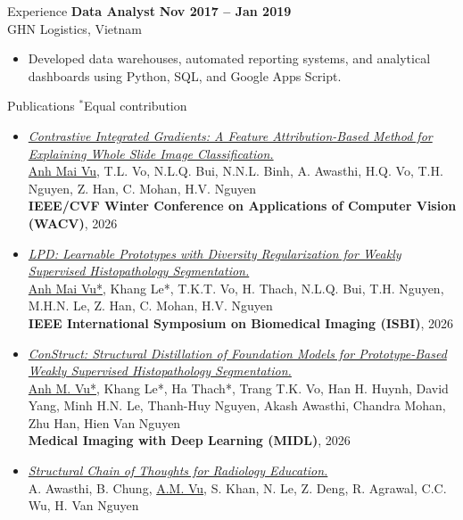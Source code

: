 \documentclass[11pt]{resume}
\newcommand{\ptitle}[1]{{\fontsize{10.5}{12}\selectfont \textit{#1}}}
\newcommand{\ptitleb}[1]{{\fontsize{9}{10.5}\selectfont \textbf{#1}}}
\begin{document}
\begin{rSection}{Experience}
\textbf{Data Analyst} \hfill \textbf{Nov 2017 -- Jan 2019} \\
GHN Logistics, Vietnam
\begin{itemize}
  \item Developed data warehouses, automated reporting systems, and analytical dashboards using Python, SQL, and Google Apps Script.
\end{itemize}
\end{rSection}
\begin{rSection}{Publications}
{\small $^{*}$Equal contribution}
\vspace{-0.5em}
\begin{itemize}
    \itemsep-0.35em
    \item
        \href{https://arxiv.org/pdf/2511.08464}{
            \ptitle{Contrastive Integrated Gradients: A Feature Attribution-Based Method for Explaining Whole Slide Image Classification.}
            }\\
          \underline{Anh Mai Vu}, T.L. Vo, N.L.Q. Bui, N.N.L. Binh, A. Awasthi, H.Q. Vo, T.H. Nguyen, Z. Han, C. Mohan, H.V. Nguyen \\
          \ptitleb{IEEE/CVF Winter Conference on Applications of Computer Vision (WACV)}, 2026
    \item \href{https://arxiv.org/pdf/2512.05922}{\ptitle{LPD: Learnable Prototypes with Diversity Regularization for Weakly Supervised Histopathology Segmentation.}} \\
      \underline{Anh Mai Vu*}, Khang Le*, T.K.T. Vo, H. Thach, N.L.Q. Bui, T.H. Nguyen, M.H.N. Le, Z. Han, C. Mohan, H.V. Nguyen \\
    \ptitleb{IEEE International Symposium on Biomedical Imaging (ISBI)}, 2026
    \item \href{https://arxiv.org/pdf/2512.10316}{\ptitle{ConStruct: Structural Distillation of Foundation Models for Prototype-Based Weakly Supervised Histopathology Segmentation.}} \\
      \underline{Anh M. Vu*}, Khang Le*, Ha Thach*, Trang T.K. Vo, Han H. Huynh, David Yang, Minh H.N. Le, Thanh-Huy Nguyen, Akash Awasthi, Chandra Mohan, Zhu Han, Hien Van Nguyen \\
      \ptitleb{Medical Imaging with Deep Learning (MIDL)}, 2026
    \item \href{https://www.sciencedirect.com/science/article/abs/pii/S0950705125014728}{\ptitle{Structural Chain of Thoughts for Radiology Education.}} \\
          A. Awasthi, B. Chung, \underline{A.M. Vu}, S. Khan, N. Le, Z. Deng, R. Agrawal, C.C. Wu, H. Van Nguyen \\

\end{itemize}
\end{rSection}
\end{document}
